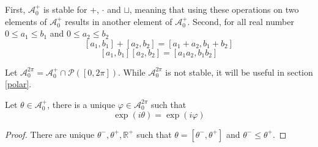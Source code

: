 First, $\mathcal{A}_0^+$ is stable for +, $\cdot$ and $\sqcup$, meaning that using these operations on two elements of $\mathcal{A}_0^+$ results in another element of $\mathcal{A}_0^+$. Second, for all real number $0 \le a_1 \le b_1$ and $0 \le a_2 \le b_2$
$$[a_1, b_1] + [a_2, b_2] = [a_1 + a_2, b_1 + b_2]$$
$$[a_1, b_1] [a_2, b_2] = [a_1 a_2, b_1 b_2]$$

Let $\mathcal{A}_0^{2\pi} = \mathcal{A}_0^+ \cap \mathcal{P}([0, 2\pi])$. While $\mathcal{A}_0^{2\pi}$ is not stable, it will be useful in section \ref{polar}.

\begin{theorem}
Let $\theta \in \mathcal{A}_0^+$, there is a unique $\varphi \in \mathcal{A}_0^{2\pi}$ such that
$$\exp(i\theta) = \exp(i \varphi)$$
\end{theorem}

\begin{proof}
There are unique $\theta^-, \theta^+, \mathbb{R}^+$ such that $\theta = [\theta^-, \theta^+]$ and $\theta^- \le \theta^+$.

\end{proof}
